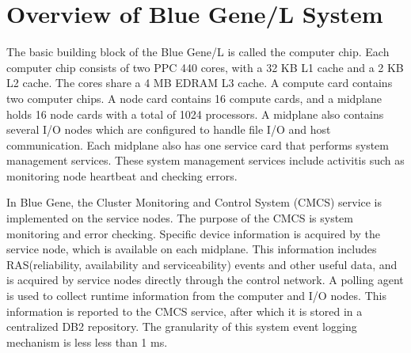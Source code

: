 \chapter{Overview of Blue Gene/L System}
The basic building block of the Blue Gene/L is called the computer chip. Each computer chip consists of two PPC 440 cores, with a 32 KB L1 cache and a 2 KB L2 cache. The cores share a 4 MB EDRAM L3 cache. A compute card contains two computer chips. A node card contains 16 compute cards, and a midplane holds 16 node cards with a total of 1024 processors. A midplane also contains several I/O nodes which are configured to handle file I/O and host communication. Each midplane also has one service card that performs system management services. These system management services include activitis such as monitoring node heartbeat and checking errors. 

In Blue Gene, the Cluster Monitoring and Control System (CMCS) service is implemented on the service nodes. The purpose of the CMCS is system monitoring and error checking. Specific device information is acquired by the service node, which is available on each midplane. This information includes RAS(reliability, availability and serviceability) events and other useful data, and is acquired by service nodes directly through the control network. A polling agent is used to collect runtime information from the computer and I/O nodes. This information is reported to the CMCS service, after which it is stored in a centralized DB2 repository. The granularity of this system event logging mechanism is less less than 1 ms.
